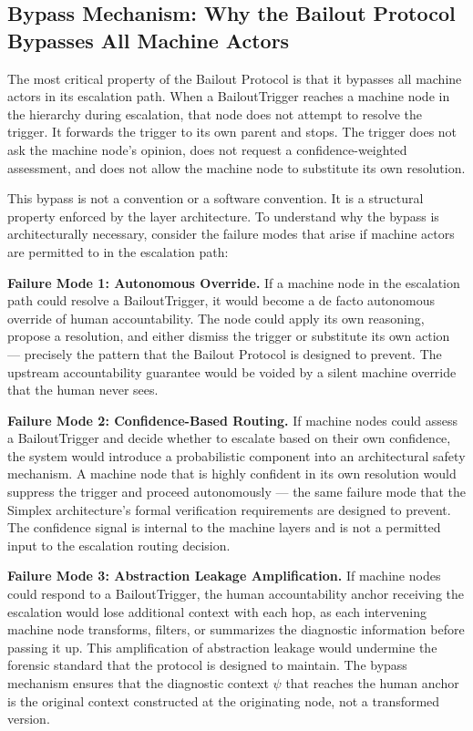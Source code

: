 \subsection{Bypass Mechanism: Why the Bailout Protocol Bypasses All Machine Actors}
\label{sec:bypass-mechanism}

The most critical property of the Bailout Protocol is that it bypasses all machine actors in its escalation path. When a BailoutTrigger reaches a machine node in the hierarchy during escalation, that node does not attempt to resolve the trigger. It forwards the trigger to its own parent and stops. The trigger does not ask the machine node's opinion, does not request a confidence-weighted assessment, and does not allow the machine node to substitute its own resolution.

This bypass is not a convention or a software convention. It is a structural property enforced by the layer architecture. To understand why the bypass is architecturally necessary, consider the failure modes that arise if machine actors are permitted to in the escalation path:

\bigskip

\noindent\textbf{Failure Mode 1: Autonomous Override.} If a machine node in the escalation path could resolve a BailoutTrigger, it would become a de facto autonomous override of human accountability. The node could apply its own reasoning, propose a resolution, and either dismiss the trigger or substitute its own action --- precisely the pattern that the Bailout Protocol is designed to prevent. The upstream accountability guarantee would be voided by a silent machine override that the human never sees.

\bigskip

\noindent\textbf{Failure Mode 2: Confidence-Based Routing.} If machine nodes could assess a BailoutTrigger and decide whether to escalate based on their own confidence, the system would introduce a probabilistic component into an architectural safety mechanism. A machine node that is highly confident in its own resolution would suppress the trigger and proceed autonomously --- the same failure mode that the Simplex architecture's formal verification requirements are designed to prevent. The confidence signal is internal to the machine layers and is not a permitted input to the escalation routing decision.

\bigskip

\noindent\textbf{Failure Mode 3: Abstraction Leakage Amplification.} If machine nodes could respond to a BailoutTrigger, the human accountability anchor receiving the escalation would lose additional context with each hop, as each intervening machine node transforms, filters, or summarizes the diagnostic information before passing it up. This amplification of abstraction leakage would undermine the forensic standard that the protocol is designed to maintain. The bypass mechanism ensures that the diagnostic context $\psi$ that reaches the human anchor is the original context constructed at the originating node, not a transformed version.

